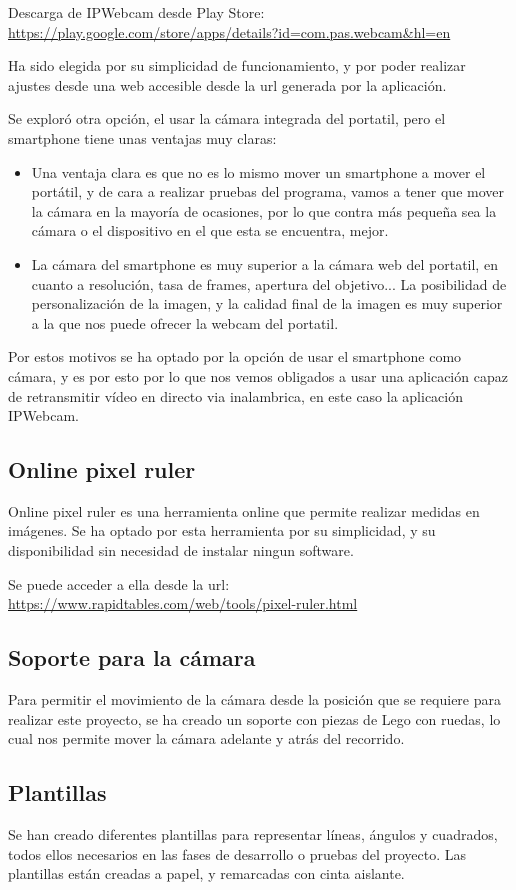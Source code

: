 Descarga de IPWebcam desde Play Store: \url{https://play.google.com/store/apps/details?id=com.pas.webcam&hl=en}

Ha sido elegida por su simplicidad de funcionamiento, y por poder realizar ajustes desde una web accesible desde la url generada por la aplicación.

Se exploró otra opción, el usar la cámara integrada del portatil, pero el smartphone tiene unas ventajas muy claras:

\begin{itemize}
	
	\item Una ventaja clara es que no es lo mismo mover un smartphone a mover el portátil, y de cara a realizar pruebas del programa, vamos a tener que mover la cámara en la mayoría de ocasiones, por lo que contra más pequeña sea la cámara o el dispositivo en el que esta se encuentra, mejor.
	
	\item La cámara del smartphone es muy superior a la cámara web del portatil, en cuanto a resolución, tasa de frames, apertura del objetivo... La posibilidad de personalización de la imagen, y la calidad final de la imagen es muy superior a la que nos puede ofrecer la webcam del portatil.
	
\end{itemize}

Por estos motivos se ha optado por la opción de usar el smartphone como cámara, y es por esto por lo que nos vemos obligados a usar una aplicación capaz de retransmitir vídeo en directo via inalambrica, en este caso la aplicación IPWebcam.

\subsection{Online pixel ruler}
Online pixel ruler es una herramienta online que permite realizar medidas en imágenes. Se ha optado por esta herramienta por su simplicidad, y su disponibilidad sin necesidad de instalar ningun software. 

Se puede acceder a ella desde la url: \url{https://www.rapidtables.com/web/tools/pixel-ruler.html}


\subsection{Soporte para la cámara}
Para permitir el movimiento de la cámara desde la posición que se requiere para realizar este proyecto, se ha creado un soporte con piezas de Lego con ruedas, lo cual nos permite mover la cámara adelante y atrás del recorrido.
 
\subsection{Plantillas}
Se han creado diferentes plantillas para representar líneas, ángulos y cuadrados, todos ellos necesarios en las fases de desarrollo o pruebas del proyecto. Las plantillas están creadas a papel, y remarcadas con cinta aislante.


